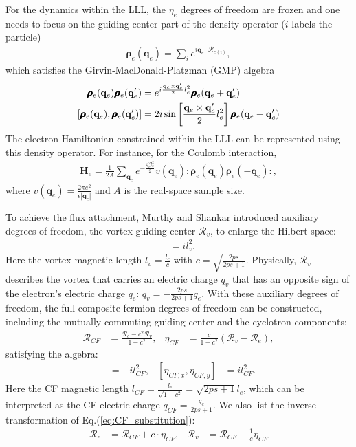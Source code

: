 For the dynamics within the LLL, the $\eta_e$ degrees of freedom are frozen and one needs to focus on the guiding-center part of the density operator ($i$ labels the particle) 
\begin{align}
\pmb{\boldsymbol\rho}_e(\mathbf q_e)=\sum_{i}e^{i\mathbf q_e\cdot \mathcal R_{e(i)}},\label{eq:e_density}
\end{align}
which satisfies the Girvin-MacDonald-Platzman (GMP) algebra \cite{girvin1986magneto}
\begin{align}
\pmb{\boldsymbol\rho}_e(\mathbf q_e)\pmb{\boldsymbol\rho}_e(\mathbf q_e')&=e^{i\frac{\mathbf q_e\times \mathbf q_e'}{2}l_e^2}\pmb{\boldsymbol\rho}_e(\mathbf q_e+\mathbf q_e')\notag\\
[\pmb{\boldsymbol\rho}_e(\mathbf q_e),\pmb{\boldsymbol\rho}_e(\mathbf q_e')]&=2i\sin\left[\frac{\mathbf q_e\times \mathbf q_e'}{2}l_e^2\right]\pmb{\boldsymbol\rho}_e(\mathbf q_e+\mathbf q_e')\label{eq:GMP}
\end{align}
The electron Hamiltonian constrained within the LLL can be represented using this density operator. For instance, for the Coulomb interaction,
\begin{align}
\mathbf H_e=\frac{1}{2 A}\sum_{\mathbf q_e} e^{-\frac{\mathbf q_e^2l_e^2}{2}}v(\mathbf q_e):\pmb{\boldsymbol\rho}_e(\mathbf q_e)\pmb{\boldsymbol\rho}_e(-\mathbf q_e):,
\end{align}
where $v(\mathbf q_e)=\frac{2\pi e^2}{\epsilon |\mathbf q_e|}$ and $A$ is the real-space sample size.

To achieve the flux attachment, Murthy and Shankar introduced auxiliary degrees of freedom, the vortex guiding-center $\mathcal R_v$, to enlarge the Hilbert space:
\begin{align}
[\mathcal R_{v,x},\mathcal R_{v,y}]&=il_v^2.\label{eq:v_guiding_center}
\end{align}
Here the vortex magnetic length $l_v=\frac{l_e}{c}$ with $c=\sqrt{\frac{2ps}{2ps+1}}$. Physically, $\mathcal R_v$ describes the vortex that carries an electric charge $q_v$ that has an opposite sign of the electron's electric charge $q_e$:  $q_v=-\frac{2ps}{2ps+1}q_e$. With these auxiliary degrees of freedom, the full composite fermion degrees of freedom can be constructed, including the mutually commuting guiding-center and the cyclotron components:
\begin{align}
\mathcal R_{CF}&=\frac{\mathcal R_e-c^2\mathcal R_v}{1-c^2},&\eta_{CF}&=\frac{c}{1-c^2}(\mathcal R_v-\mathcal R_e), \label{eq:CF_substitution}
\end{align}
satisfying the algebra:
\begin{align}
[\mathcal R_{CF,x},\mathcal R_{CF,y}]&=-il_{CF}^2,&[\eta_{CF,x},\eta_{CF,y}]&=il_{CF}^2.\label{eq:CF_algebra}
\end{align}
Here the CF magnetic length $l_{CF}=\frac{l_e}{\sqrt{1-c^2}}=\sqrt{2ps+1}l_e$, which can be interpreted as the CF electric charge $q_{CF}=\frac{q_e}{2ps+1}$. We also list the inverse transformation of Eq.(\ref{eq:CF_substitution}):
\begin{align}
\mathcal R_e&=\mathcal R_{CF}+c\cdot\eta_{CF},&\mathcal R_v&=\mathcal R_{CF}+\frac{1}{c}\eta_{CF}\label{eq:CF_substitution_inverse}
\end{align}

